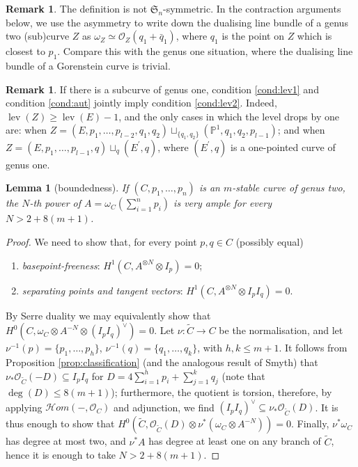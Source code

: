 \documentclass[11pt]{amsart}
\newcommand{\PP}{\mathbb P}
\newcommand{\OO}{\mathcal O}
\renewcommand{\to}{\rightarrow}
\newcommand{\hhom}{\mathcal{H}\!om}
\newcommand{\lev}{\operatorname{lev}}
\theoremstyle{plain}
\newtheorem{lem}[thm]{Lemma}
\theoremstyle{definition}
\newtheorem{rem}[thm]{Remark}
\begin{document}
\begin{rem}
 The definition is not $\mathfrak{S}_n$-symmetric. In the contraction arguments below, we use the asymmetry to write down the dualising line bundle of a genus two (sub)curve $Z$ as $\omega_Z\simeq\OO_Z(q_1+\bar q_1)$, where $q_1$ is the point on $Z$ which is closest to $p_1$. Compare this with the genus one situation, where the dualising line bundle of a Gorenstein curve is trivial.
\end{rem}
\begin{rem}\label{rmk:lev1solev2}
 If there is a subcurve of genus one, condition \eqref{cond:lev1} and condition \eqref{cond:aut} jointly imply condition \eqref{cond:lev2}. Indeed, $\lev(Z)\geq\lev(E)-1$, and the only cases in which the level drops by one are: when $Z=(E,p_1,\ldots,p_{l-2},q_1,q_2)\sqcup_{\{q_1,q_2\}}(\PP^1,q_1,q_2,p_{l-1})$; and when $Z=(E,p_1,\ldots,p_{l-1},q)\sqcup_q(E^\prime,q)$, where $(E^\prime,q)$ is a one-pointed curve of genus one.
\end{rem}


\begin{lem}[boundedness]
 If $(C,p_1,\ldots,p_n)$ is an $m$-stable curve of genus two, the $N$-th power of $A=\omega_C(\sum_{i=1}^np_i)$ is very ample for every $N>2+8(m+1)$.
\end{lem}
\begin{proof}
 We need to show that, for every point $p,q\in C$ (possibly equal)
 \begin{enumerate}
  \item \emph{basepoint-freeness}: $H^1(C,A^{\otimes N}\otimes I_p)=0$;
  \item \emph{separating points and tangent vectors}: $H^1(C,A^{\otimes N}\otimes I_pI_q)=0$.
 \end{enumerate}
By Serre duality we may equivalently show that $H^0(C,\omega_C\otimes A^{-N}\otimes(I_pI_q)^\vee)=0$. Let $\nu\colon\tilde C\to C$ be the normalisation, and let $\nu^{-1}(p)=\{p_1,\ldots,p_h\}$, $\nu^{-1}(q)=\{q_1,\ldots,q_k\}$, with $h,k\leq m+1$. It follows from Proposition \ref{prop:classification} (and the analogous result of Smyth) that $\nu_*\OO_{\tilde C}(-D)\subseteq I_pI_q$ for $D=4\sum_{i=1}^hp_i+\sum_{j=1}^kq_j$ (note that $\deg(D)\leq 8(m+1)$); furthermore, the quotient is torsion, therefore, by applying $\hhom(-,\OO_C)$ and adjunction, we find $(I_pI_q)^\vee\subseteq\nu_*\OO_{\tilde C}(D)$. It is thus enough to show that $H^0(\tilde C,\OO_{\tilde C}(D)\otimes\nu^*(\omega_C\otimes A^{-N}))=0$. Finally, $\nu^*\omega_C$ has degree at most two, and $\nu^*A$ has degree at least one on any branch of $\tilde C$, hence it is enough to take $N>2+8(m+1)$.
\end{proof}
\end{document}
